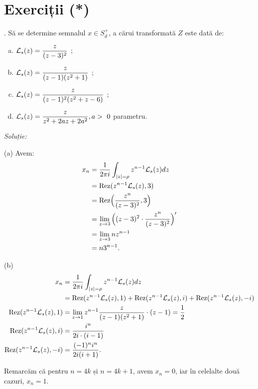 
\section{Exerciții (*)}

\indent{}. Să se determine semnalul $x \in S_d^+$, a cărui transformată $Z$ este 
dată de:
\begin{enumerate}[(a)]
\item $\mathcal{L}_s (z) = \dfrac{z}{(z-3)^2}$ ;
\item $\mathcal{L}_s (z) = \dfrac{z}{(z-1)(z^2 + 1)}$ ;
\item $\mathcal{L}_s (z) = \dfrac{z}{(z-1)^2(z^2 + z - 6)}$ ;
\item $\Lap_s (z) = \dfrac{z}{z^2 + 2az + 2a^2}, a > 0$ parametru.
\end{enumerate}

\emph{Soluție:}

(a) Avem:
\begin{align*}
  x_n &= \dfrac{1}{2\pi i} \int_{|z| = \rho} z^{n-1} \mathcal{L}_s (z) dz \\
      &= \mathrm{Rez}(z^{n-1} \mathcal{L}_s(z), 3) \\
      &= \mathrm{Rez} \Big( \dfrac{z^n}{(z-3)^2}, 3 \Big) \\
      &= \lim_{z \to 3} \Big( (z-3)^2 \cdot \dfrac{z^n}{(z-3)^2} \Big)^{\prime} \\
      &= \lim_{z \to 3} nz^{n-1} \\
      &= n3^{n-1}.
\end{align*}

(b)
\begin{align*}
  x_n &= \dfrac{1}{2 \pi i} \int_{|z| = \rho} z^{n-1} \mathcal{L}_s(z) dz \\
      &= \mathrm{Rez}(z^{n-1} \mathcal{L}_s (z), 1) + \mathrm{Rez}(z^{n-1} \mathcal{L}_s(z), i) + 
        \mathrm{Rez}(z^{n-1} \mathcal{L}_s(z), -i) \\
  \mathrm{Rez}(z^{n-1}\mathcal{L}_s(z),1) &= \lim_{z \to 1} z^{n-1} \dfrac{z}{(z - 1)(z^2 + 1)} 
                             \cdot (z-1) = \dfrac{1}{2} \\
  \mathrm{Rez}(z^{n-1} \mathcal{L}_s(z), i) &= \dfrac{i^n}{2i \cdot (i-1)} \\
  \mathrm{Rez}(z^{n-1} \mathcal{L}_s(z), -i) &= \dfrac{(-1)^n i^n}{2i(i+1)}.
\end{align*}

Remarcăm că pentru $n = 4k$ și $n = 4k+1$, avem $x_n = 0$, iar în celelalte 
două cazuri, $x_n = 1$. \\

